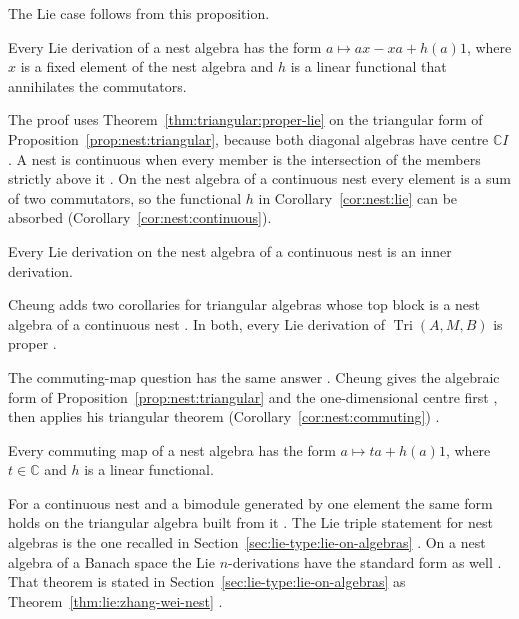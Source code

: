 The Lie case follows from this proposition.

\begin{corollary}\label{cor:nest:lie}
Every Lie derivation of a nest algebra has the form $a\mapsto ax-xa+h(a)1$, where
$x$ is a fixed element of the nest algebra and $h$ is a linear functional that
annihilates the commutators.
\end{corollary}

The proof uses Theorem~\ref{thm:triangular:proper-lie} on the triangular form of
Proposition~\ref{prop:nest:triangular}, because both diagonal algebras have centre
$\mathbb{C}I$ \cite[p.~309]{Cheung2003}. A nest is continuous when every member is
the intersection of the members strictly above it \cite[p.~309]{Cheung2003}. On
the nest algebra of a continuous nest every element is a sum of two commutators,
so the functional $h$ in Corollary~\ref{cor:nest:lie} can be absorbed
\cite[p.~309]{Cheung2003} (Corollary~\ref{cor:nest:continuous}).

\begin{corollary}\label{cor:nest:continuous}
Every Lie derivation on the nest algebra of a continuous nest is an inner
derivation.
\end{corollary}

Cheung adds two corollaries for triangular algebras whose top block is a nest
algebra of a continuous nest \cite[Corollaries~24--25, p.~309]{Cheung2003}. In
both, every Lie derivation of $\operatorname{Tri}(A,M,B)$ is proper
\cite[p.~309]{Cheung2003}.

The commuting-map question has the same answer
\cite[Corollary~7, p.~126]{Cheung2001}. Cheung gives the algebraic form of
Proposition~\ref{prop:nest:triangular} and the one-dimensional centre first
\cite[Propositions~5--6, p.~126]{Cheung2001}, then applies his triangular theorem (Corollary~\ref{cor:nest:commuting})
\cite[Corollary~1, p.~124]{Cheung2001}.\begin{corollary}\label{cor:nest:commuting}
Every commuting map of a nest algebra has the form $a\mapsto ta+h(a)1$, where
$t\in\mathbb{C}$ and $h$ is a linear functional.
\end{corollary}

For a continuous nest and a bimodule generated by one element the same form holds
on the triangular algebra built from it \cite[Corollary~8, p.~127]{Cheung2001}. The Lie
triple statement for nest algebras is the one recalled in
Section~\ref{sec:lie-type:lie-on-algebras}
\cite[Corollary~5.12, p.~163]{Benkovic2015}. On a nest algebra of a Banach space
the Lie $n$-derivations have the standard form as well
\cite[Theorem~3.1, p.~6]{ZhangWei2017Nest}. That theorem is stated in
Section~\ref{sec:lie-type:lie-on-algebras} as
Theorem~\ref{thm:lie:zhang-wei-nest} \cite[p.~6]{ZhangWei2017Nest}.

